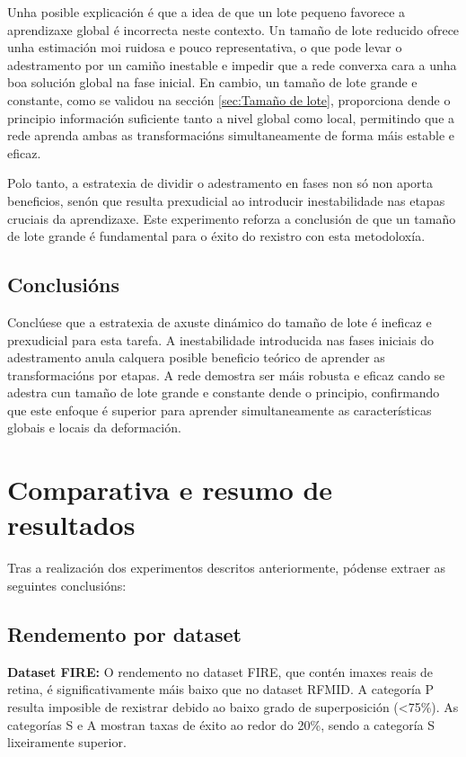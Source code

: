 Unha posible explicación é que a idea de que un lote pequeno favorece a aprendizaxe global é incorrecta neste contexto. Un tamaño de lote reducido ofrece unha estimación moi ruidosa e pouco representativa, o que pode levar o adestramento por un camiño inestable e impedir que a rede converxa cara a unha boa solución global na fase inicial. En cambio, un tamaño de lote grande e constante, como se validou na sección \ref{sec:Tamaño de lote}, proporciona dende o principio información suficiente tanto a nivel global como local, permitindo que a rede aprenda ambas as transformacións simultaneamente de forma máis estable e eficaz.

Polo tanto, a estratexia de dividir o adestramento en fases non só non aporta beneficios, senón que resulta prexudicial ao introducir inestabilidade nas etapas cruciais da aprendizaxe. Este experimento reforza a conclusión de que un tamaño de lote grande é fundamental para o éxito do rexistro con esta metodoloxía.

\subsection{Conclusións}
\label{subsec:Conclusions-phases}

Conclúese que a estratexia de axuste dinámico do tamaño de lote é ineficaz e prexudicial para esta tarefa. A inestabilidade introducida nas fases iniciais do adestramento anula calquera posible beneficio teórico de aprender as transformacións por etapas. A rede demostra ser máis robusta e eficaz cando se adestra cun tamaño de lote grande e constante dende o principio, confirmando que este enfoque é superior para aprender simultaneamente as características globais e locais da deformación.


\section{Comparativa e resumo de resultados}
\label{sec:Comparativa e resumo}

Tras a realización dos experimentos descritos anteriormente, pódense extraer as seguintes conclusións:

\subsection{Rendemento por dataset}
\label{subsec:Rendemento por dataset}

\textbf{Dataset FIRE:} O rendemento no dataset FIRE, que contén imaxes reais de retina, é significativamente máis baixo que no dataset RFMID. A categoría P resulta imposible de rexistrar debido ao baixo grado de superposición (<75\%). As categorías S e A mostran taxas de éxito ao redor do 20\%, sendo a categoría S lixeiramente superior.

